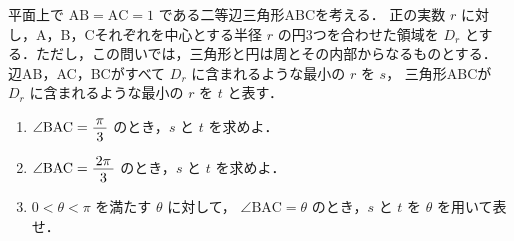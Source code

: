 ﻿\documentclass[../../../uem_mat_tok_q.tex]{subfiles}
\begin{document}
    平面上で $\mathrm{AB}=\mathrm{AC}=1$ である二等辺三角形ABCを考える．%
    正の実数 $r$ に対し，A，B，Cそれぞれを中心とする半径 $r$ の円3つを合わせた領域を %
    $D_r$ とする．ただし，この問いでは，三角形と円は周とその内部からなるものとする．%
    辺AB，AC，BCがすべて $D_r$ に含まれるような最小の $r$ を $s$，%
    三角形ABCが $D_r$ に含まれるような最小の $r$ を $t$ と表す．

    \begin{enumerate}
        \item $\angle\mathrm{BAC}=\myfraca{\pi}{3}$ のとき，$s$ と $t$ を求めよ．
        \item $\angle\mathrm{BAC}=\myfraca{2\pi}{3}$ のとき，$s$ と $t$ を求めよ．
        \item $0<\theta<\pi$ を満たす $\theta$ に対して，%
        $\angle\mathrm{BAC}=\theta$ のとき，$s$ と $t$ を $\theta$ を用いて表せ．
    \end{enumerate}
\end{document}
